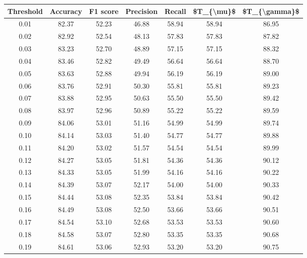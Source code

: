 \begin{tabular}{|c|c|c|c|c|c|c|}
\hline
 Threshold &  Accuracy &  F1 score &  Precision &  Recall &  \$T\_\{\textbackslash mu\}\$ &  \$T\_\{\textbackslash gamma\}\$ \\
\hline
      0.01 &     82.37 &     52.23 &      46.88 &   58.94 &      58.94 &         86.95 \\
      0.02 &     82.92 &     52.54 &      48.13 &   57.83 &      57.83 &         87.82 \\
      0.03 &     83.23 &     52.70 &      48.89 &   57.15 &      57.15 &         88.32 \\
      0.04 &     83.46 &     52.82 &      49.49 &   56.64 &      56.64 &         88.70 \\
      0.05 &     83.63 &     52.88 &      49.94 &   56.19 &      56.19 &         89.00 \\
      0.06 &     83.76 &     52.91 &      50.30 &   55.81 &      55.81 &         89.23 \\
      0.07 &     83.88 &     52.95 &      50.63 &   55.50 &      55.50 &         89.42 \\
      0.08 &     83.97 &     52.96 &      50.89 &   55.22 &      55.22 &         89.59 \\
      0.09 &     84.06 &     53.01 &      51.16 &   54.99 &      54.99 &         89.74 \\
      0.10 &     84.14 &     53.03 &      51.40 &   54.77 &      54.77 &         89.88 \\
      0.11 &     84.20 &     53.02 &      51.57 &   54.54 &      54.54 &         89.99 \\
      0.12 &     84.27 &     53.05 &      51.81 &   54.36 &      54.36 &         90.12 \\
      0.13 &     84.33 &     53.05 &      51.99 &   54.16 &      54.16 &         90.22 \\
      0.14 &     84.39 &     53.07 &      52.17 &   54.00 &      54.00 &         90.33 \\
      0.15 &     84.44 &     53.08 &      52.35 &   53.84 &      53.84 &         90.42 \\
      0.16 &     84.49 &     53.08 &      52.50 &   53.66 &      53.66 &         90.51 \\
      0.17 &     84.54 &     53.10 &      52.68 &   53.53 &      53.53 &         90.60 \\
      0.18 &     84.58 &     53.07 &      52.80 &   53.35 &      53.35 &         90.68 \\
      0.19 &     84.61 &     53.06 &      52.93 &   53.20 &      53.20 &         90.75 \\

\end{tabular}
